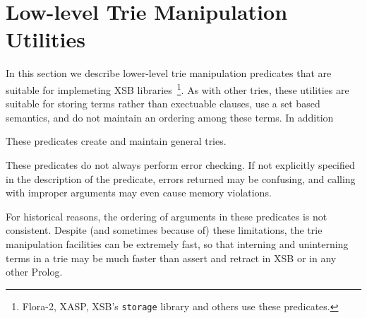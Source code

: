 \section{Low-level Trie Manipulation Utilities}

In this section we describe lower-level trie manipulation predicates
that are suitable for implemeting XSB libraries~\footnote{Flora-2,
  XASP, XSB's {\tt storage} library and others use these predicates.}.
As with other tries, these utilities are suitable for storing terms
rather than exectuable clauses, use a set based semantics, and do not
maintain an ordering among these terms.  In addition
%
\bi
\item These predicates create and maintain
  general tries.
%
\item These predicates do not always perform error checking.  If not
  explicitly specified in the description of the predicate, errors
  returned may be confusing, and calling with improper arguments may
  even cause memory violations.  
%
\item For historical reasons, the ordering of arguments in these
  predicates is not consistent.
\ei
%
Despite (and sometimes because of) these limitations, the trie
manipulation facilities can be extremely fast, so that interning and
uninterning terms in a trie may be much faster than assert and retract
in XSB or in any other Prolog.

